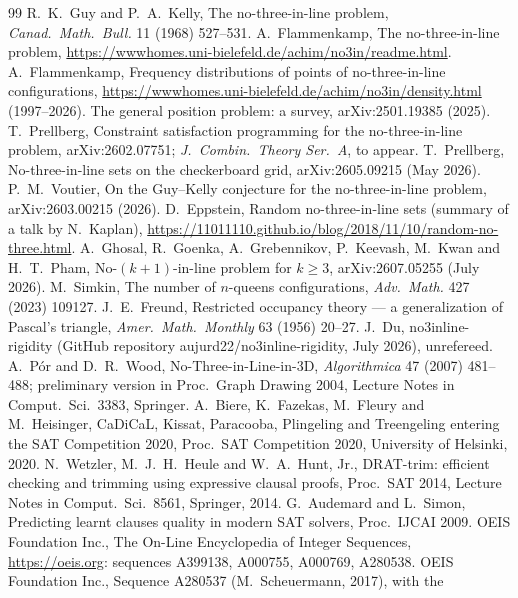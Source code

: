 \documentclass[11pt,a4paper]{article}
\begin{document}
\begin{thebibliography}{99}
 R.~K.~Guy and P.~A.~Kelly, The no-three-in-line problem, \emph{Canad.\ Math.\ Bull.} 11 (1968) 527--531.
 A.~Flammenkamp, The no-three-in-line problem, \url{https://wwwhomes.uni-bielefeld.de/achim/no3in/readme.html}.
 A.~Flammenkamp, Frequency distributions of points of no-three-in-line configurations,
\url{https://wwwhomes.uni-bielefeld.de/achim/no3in/density.html} (1997--2026).
 The general position problem: a survey, arXiv:2501.19385 (2025).
 T.~Prellberg, Constraint satisfaction programming for the no-three-in-line problem, arXiv:2602.07751;
\emph{J.\ Combin.\ Theory Ser.~A}, to appear.
 T.~Prellberg, No-three-in-line sets on the checkerboard grid, arXiv:2605.09215 (May 2026).
 P.~M.~Voutier, On the Guy--Kelly conjecture for the no-three-in-line problem, arXiv:2603.00215 (2026).
 D.~Eppstein, Random no-three-in-line sets (summary of a talk by N.~Kaplan),
\url{https://11011110.github.io/blog/2018/11/10/random-no-three.html}.
 A.~Ghosal, R.~Goenka, A.~Grebennikov, P.~Keevash, M.~Kwan and H.~T.~Pham, No-$(k+1)$-in-line problem for
$k\ge3$, arXiv:2607.05255 (July 2026).
 M.~Simkin, The number of $n$-queens configurations, \emph{Adv.\ Math.} 427 (2023) 109127.
 J.~E.~Freund, Restricted occupancy theory --- a generalization of Pascal's triangle, \emph{Amer.\ Math.\
Monthly} 63 (1956) 20--27.
 J.~Du, no3inline-rigidity (GitHub repository aujurd22/no3inline-rigidity, July 2026), unrefereed.
\bibitem{PorWood} A.~P\'or and D.~R.~Wood, No-Three-in-Line-in-3D, \emph{Algorithmica} 47 (2007) 481--488;
preliminary version in Proc.\ Graph Drawing 2004, Lecture Notes in Comput.\ Sci.\ 3383, Springer.
\bibitem{Kissat} A.~Biere, K.~Fazekas, M.~Fleury and M.~Heisinger, CaDiCaL, Kissat, Paracooba, Plingeling and
Treengeling entering the SAT Competition 2020, Proc.\ SAT Competition 2020, University of Helsinki, 2020.
\bibitem{DratTrim} N.~Wetzler, M.~J.~H.~Heule and W.~A.~Hunt, Jr., DRAT-trim: efficient checking and trimming
using expressive clausal proofs, Proc.\ SAT 2014, Lecture Notes in Comput.\ Sci.\ 8561, Springer, 2014.
\bibitem{Glucose} G.~Audemard and L.~Simon, Predicting learnt clauses quality in modern SAT solvers,
Proc.\ IJCAI 2009.
 OEIS Foundation Inc., The On-Line Encyclopedia of Integer Sequences, \url{https://oeis.org}:
sequences A399138, A000755, A000769, A280538.
 OEIS Foundation Inc., Sequence A280537 (M.~Scheuermann, 2017), with the

\end{thebibliography}
\end{document}
